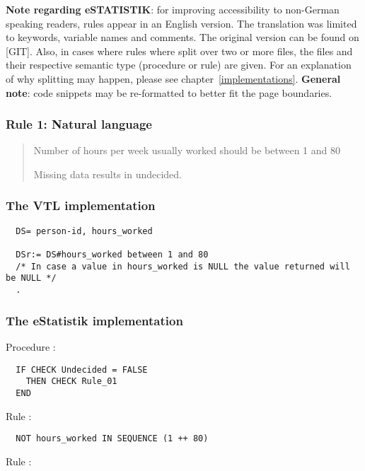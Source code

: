 \textbf{Note regarding eSTATISTIK}: for improving accessibility to non-German speaking readers, rules appear in an English version. The translation was limited to keywords, variable names and comments. The original version can be found on [GIT]. Also, in cases where rules where split over two or more files, the files and their respective semantic type (procedure or rule) are given. For an explanation of why splitting may happen, please see chapter~\ref{implementations}.
\linebreak
\linebreak
\textbf{General note}: code snippets may be re-formatted to better fit the page boundaries.

\subsubsection*{  Rule 1: Natural language}
\begin{quote}

Number of hours per week usually worked should be between 1 and 80

Missing data results in undecided.


\end{quote}
\subsubsection*{The VTL implementation}
\begin{verbatim}
  DS= person-id, hours_worked

  DSr:= DS#hours_worked between 1 and 80
  /* In case a value in hours_worked is NULL the value returned will be NULL */
  .
\end{verbatim}
\subsubsection*{The eStatistik implementation}

Procedure :

\begin{verbatim}
  IF CHECK Undecided = FALSE  
    THEN CHECK Rule_01
  END
\end{verbatim}

\noindent
Rule :

\begin{verbatim}
  NOT hours_worked IN SEQUENCE (1 ++ 80)
\end{verbatim}

\noindent
Rule :

